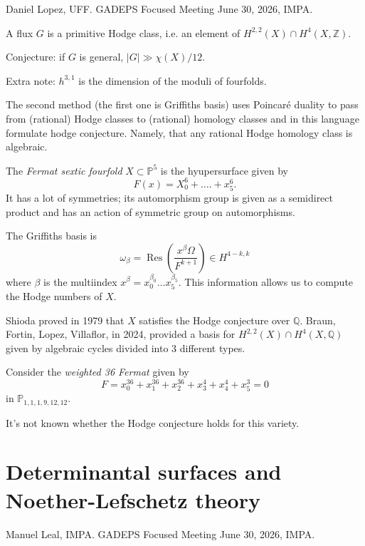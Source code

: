 \noindent
Daniel Lopez, UFF.
GADEPS Focused Meeting June 30, 2026, IMPA.

\medskip\noindent
A flux $G$ is a primitive Hodge class,
i.e. an element of $H^{2,2}(X)
\cap H^4(X,\mathbb{Z})$.

\medskip\noindent
Conjecture: if $G$ is general,
 $|G|\gg \chi(X)/12$.

\medskip\noindent
Extra note:
$h^{3,1}$ is the dimension of the moduli
of fourfolds.

\noindent
The second method (the first
one is Griffiths basis)
uses Poincaré duality to pass
from (rational) Hodge classes
to (rational) homology classes and in
this language formulate hodge conjecture.
Namely, that any rational Hodge homology
class is algebraic.

\begin{example}
\label{example-fermat-sextic}
The {\it Fermat sextic fourfold} 
$X \subset \mathbb{P}^5$ is the hyupersurface
given by
$$
F(x) = X_0^6+….+x_5^6.
$$
It has a lot of symmetries;
its automorphism group
is given as a semidirect product
and has an action
of symmetric group on automorphisms.

The Griffiths basis is
$$
\omega_\beta=
\operatorname{Res}
\left(\frac{x^\beta \Omega}{F^{k+1}}\right)
\in H^{4-k,k}
$$
where $\beta$ is the multiindex
$x^\beta= x_0^{\beta_0}…x_5^{\beta_5}$.
This information allows us to compute
the Hodge numbers of $X$.

Shioda proved in 1979 that $X$ satisfies
the Hodge conjecture over $\mathbb{Q}$.
Braun, Fortin, Lopez, Villaflor, in 2024,
provided a basis for $H^{2,2}(X) \cap
H^4(X,\mathbb{Q})$ given by algebraic cycles
divided into 3 different types.
\end{example}

\begin{example}
\label{example-weighted-36-fermat}
Consider the {\it weighted 36 Fermat} 
given by
$$
F=x_0^{36}+x_1^{36}+x_2^{36}+x_3^4
+x_4^4+x_5^3=0
$$
in $\mathbb{P}_{1,1,1,9,12,12}$.

It's not known whether the Hodge conjecture
holds for this variety.
\end{example}

\section{Determinantal surfaces
and Noether-Lefschetz theory}
\label{section-determinantal-surfaces-nl}

\noindent
Manuel Leal, IMPA.
GADEPS Focused Meeting June 30, 2026, IMPA.

